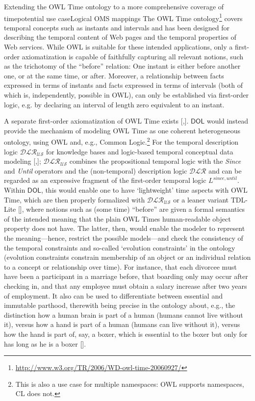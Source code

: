 \documentclass[10pt,fleqn,final]{scrreprt}
\makeatletter
\newcommand*{\eg}{e.g.\@\xspace}
\newcommand*{\DOL}{\ensuremath{\mathsf{DOL}}\xspace}
\makeatother
\begin{document}
\begin{usecase}{Extending the OWL Time ontology to a more comprehensive coverage of time}{potential use case}{Logical OMS mappings}
The OWL Time ontology\footnote{\url{http://www.w3.org/TR/2006/WD-owl-time-20060927/}} covers temporal concepts such as instants and intervals and has been designed for describing the temporal content of Web pages and the temporal properties of Web services.  While OWL is suitable for these intended applications, only a first-order axiomatization is capable of faithfully capturing all relevant notions, such as the trichotomy of the ``before'' relation: One instant is either before another one, or at the same time, or after.  Moreover, a relationship between facts expressed in terms of instants and facts expressed in terms of intervals (both of which is, independently, possible in OWL), can only be established via first-order logic, \eg by declaring an interval of length zero equivalent to an instant. 

A separate first-order axiomatization of OWL Time exists
[\cite{OWLTime},\cite{OWLSTime}].  \DOL would instead provide the mechanism of modeling
OWL Time as one coherent heterogeneous ontology, using OWL and, \eg,
Common Logic.\footnote{This is also a use case for multiple namespaces:
  OWL supports namespaces, CL does not.}  For the temporal description
logic $\mathcal{DLR_{US}}$ for knowledge bases and logic-based
temporal conceptual data modeling [\cite{Artale02},\cite{Artale07a}];
$\mathcal{DLR_{US}}$ combines the propositional temporal logic with
the {\em Since} and {\em Until} operators and the (non-temporal)
description logic $\mathcal{DLR}$ and can be regarded as an expressive
fragment of the first-order temporal logic $L^{since, until}$. Within
\DOL, this would enable one to have `lightweight' time aspects with OWL
Time, which are then properly formalized with $\mathcal{DLR_{US}}$ or
a leaner variant TDL-Lite [\cite{Artale07time}], where notions such as
(some time) ``before'' are given a formal semantics of the intended
meaning that the plain OWL Times human-readable object property does
not have. The latter, then, would enable the modeler to represent the
meaning---hence, restrict the possible models---and check the
consistency of the temporal constraints and so-called `evolution
constraints' in the ontology (evolution constraints constrain
membership of an object or an individual relation to a concept or
relationship over time). For instance, that each divorcee must have
been a participant in a marriage before, that boarding only may occur
after checking in, and that any employee must obtain a salary increase
after two years of employment. It also can be used to differentiate
between essential and immutable parthood, therewith being precise in
the ontology about, e.g., the distinction how a human brain is part of
a human (humans cannot live without it), versus how a hand is part of
a human (humans can live without it), versus how the hand is part of,
say, a boxer, which is essential to the boxer but only for has long as
he is a boxer [\cite{AGK08}].

\end{usecase}
\end{document}
